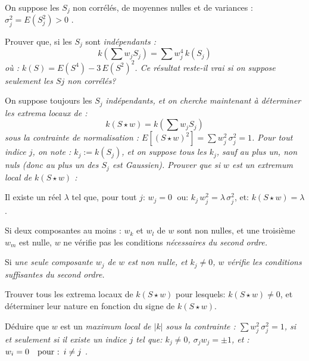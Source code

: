 \documentclass[12pt,a4paper,fleqn]{report}
\newcommand{\on}{\begin{displaymath}}
\newcommand{\off}{\end{displaymath}}
\newcommand{\push}[1]{\rule{0pt}{0pt}\hspace{#1pt}}
\begin{document}
\begin{exercice}
On suppose les $S_j$ non corrélés, de moyennes nulles et de variances :  $\sigma_j^2=E(S_j^2)>0$ .
\begin{questions}
\item  Prouver que, si les $S_j$ sont  \it indépendants \rm :
\on k(\sum w_jS_j)=\sum w_j^4\, k(S_j) \off
où : $k(S)=E(S^4)-3\,E(S^2)^2$. Ce résultat reste-il vrai si on suppose seulement les $Sj$ non corrélés?
\item On suppose toujours les $S_j$ \it indépendants\rm, et on cherche maintenant à déterminer les extrema locaux de :
\on k(S\star w)=k(\sum w_jS_j) \off
sous la contrainte de normalisation : $E[(S\star w)^2]=\sum w_j^2\,\sigma_j^2=1$.
Pour tout indice $j$, on note : $k_j:=k(S_j)$, et on suppose tous les $k_j$, \it sauf au plus un\rm, non nuls (donc au plus un des $S_j$ est Gaussien).  Prouver que si $w$ est un extremum local de $k(S\star w)$ :
\begin{subquestions}
\item Il existe un réel $\lambda$ tel que, pour tout $j$:
$ w_j=0\;$  ou:  $ k_j\,w_j^2= \lambda\,\sigma_j^2 $, et:  $k(S\star w)=\lambda$.
\item  Si deux composantes  au moins  : $w_k$ et $w_l$ de $w$ sont  non nulles, et une troisième $w_m$ est nulle, $w$ ne vérifie pas les conditions  \it nécessaires \rm du second ordre.
\item  Si \it une seule \rm  composante $w_j$ de $w$ est non nulle, et $k_j\neq 0$, $w$ vérifie les conditions \it suffisantes \rm du second ordre.
\end{subquestions}
\item Trouver tous les extrema locaux de $k(S\star w)$ pour lesquels: $k(S\star w)\neq 0$, et déterminer  leur nature en fonction du signe de $k(S\star w)$.
\item Déduire que $w$ est un \it maximum \rm  local de $|k|$ sous la contrainte : $\sum w_j^2\,\sigma_j^2=1$, si et seulement si il existe un indice $j$ tel que:  $k_j\neq 0$,
$  \sigma_j w_j=\pm 1$, et : $w_i = 0\push{10}\mbox{pour :}\push 5 i\neq j $ .
\end{questions}
\end{exercice}

\pagebreak
\end{document}
